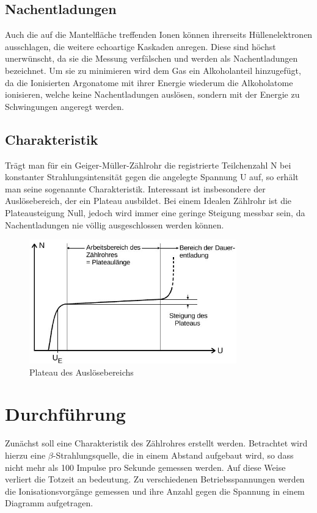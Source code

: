 \subsection{Nachentladungen}
Auch die auf die Mantelfläche treffenden Ionen können ihrerseits Hüllenelektronen ausschlagen, die weitere echoartige Kaskaden anregen. Diese sind höchst unerwünscht, da sie die Messung verfälschen und werden als Nachentladungen bezeichnet. Um sie zu minimieren wird dem Gas ein Alkoholanteil hinzugefügt, da die Ionisierten Argonatome mit ihrer Energie wiederum die Alkoholatome ionisieren, welche keine Nachentladungen auslösen, sondern mit der Energie zu Schwingungen angeregt werden.

\subsection{Charakteristik}
Trägt man für ein Geiger-Müller-Zählrohr die registrierte Teilchenzahl N bei konstanter Strahlungsintensität gegen die angelegte Spannung U auf, so erhält man seine sogenannte Charakteristik.
Interessant ist insbesondere der Auslösebereich, der ein Plateau ausbildet. Bei einem Idealen Zählrohr ist die Plateausteigung Null, jedoch wird immer eine geringe Steigung messbar sein, da Nachentladungen nie völlig ausgeschlossen werden können.
\begin{figure}[htbp]
	\includegraphics[width=0.8\textwidth]{pics/plateau.jpg}
	\caption{Plateau des Auslösebereichs}
\end{figure}


\section{Durchführung}
Zunächst soll eine Charakteristik des Zählrohres erstellt werden. Betrachtet wird hierzu eine $\beta$-Strahlungsquelle, die in einem Abstand aufgebaut wird, so dass nicht mehr als 100 Impulse pro Sekunde gemessen werden. Auf diese Weise verliert die Totzeit an bedeutung.
Zu verschiedenen Betriebsspannungen werden die Ionisationsvorgänge gemessen und ihre Anzahl gegen die Spannung in einem Diagramm aufgetragen.

